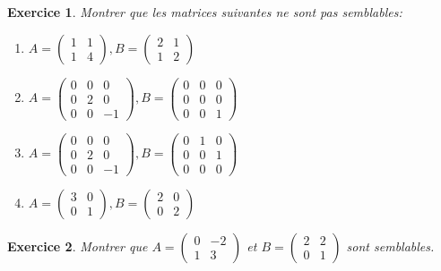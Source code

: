 \documentclass[12pt,a4paper]{article}
\theoremstyle{break}
\theoremstyle{break}
\newtheorem{Exo}{Exercice}
\begin{document}
\newpage
\begin{Exo}
	Montrer que les matrices suivantes ne sont pas semblables:
		\begin{multicols}{2}
	\begin{enumerate}
		\item
		$A=\left( \begin{matrix} 1& 1\\ 1& 4\end{matrix} \right),B= \left( \begin{matrix} 2& 1\\ 1& 2\end{matrix} \right)$
		
		\item
		$A=\left( \begin{matrix} 0& 0& 0\\ 0& 2& 0\\ 0& 0& -1\end{matrix} \right) ,B=\left( \begin{matrix} 0& 0& 0\\ 0& 0& 0\\ 0& 0& 1\end{matrix} \right)$
		\item
		$A=\left( \begin{matrix} 0& 0& 0\\ 0& 2& 0\\ 0& 0& -1\end{matrix} \right) ,B=\left( \begin{matrix} 0& 1& 0\\ 0& 0& 1\\ 0& 0& 0\end{matrix} \right)$
		\item
		$A=\left( \begin{matrix} 3& 0\\ 0& 1\end{matrix} \right) ,B=\left( \begin{matrix} 2& 0\\ 0& 2\end{matrix} \right)$
	\end{enumerate}
		\end{multicols}
\end{Exo}

\begin{Exo}
	Montrer que $A=\left( \begin{matrix} 0& -2\\ 1& 3\end{matrix} \right)$ et $B=\left( \begin{matrix} 2& 2\\ 0& 1\end{matrix} \right)$ sont semblables.
\end{Exo}
\end{document}
